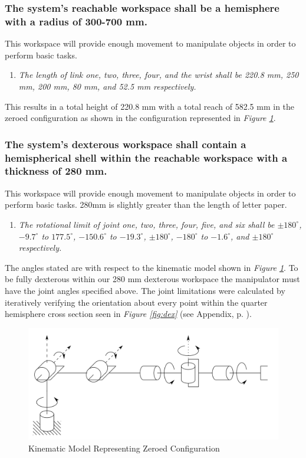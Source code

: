 \documentclass[12pt]{report}
\begin{document}
\subsubsection{The system’s reachable workspace shall be a hemisphere with a radius of 300-700 mm.}
This workspace will provide enough movement to manipulate objects in order to perform basic tasks.
\begin{enumerate}
  \item \textit{The length of link one, two, three, four, and the wrist shall be 220.8 mm, 250 mm, 200 mm, 80 mm, and 52.5 mm respectively.}
\end{enumerate}
  This results in a total height of 220.8 mm with a total reach of 582.5 mm in the zeroed configuration as shown in the configuration represented in \emph{Figure \ref{fig:zero}}.

\subsubsection{The system’s dexterous workspace shall contain a hemispherical shell within the reachable workspace with a thickness of 280 mm.}\label{sec:zero}
This workspace will provide enough movement to manipulate objects in order to perform basic tasks. 280mm is slightly greater than the length of letter paper.
\begin{enumerate}
  \item \textit{The rotational limit of joint one, two, three, four, five, and six shall be \(\pm180^{\circ}\), \(-9.7^{\circ}\) to \(177.5^{\circ}\), \(-150.6^{\circ}\) to \(-19.3^{\circ}\), \(\pm180^{\circ}\), \(-180^{\circ}\) to \(-1.6^{\circ}\), and \(\pm180^{\circ}\) respectively.}
\end{enumerate}
The angles stated are with respect to the kinematic model shown in \emph{Figure \ref{fig:zero}}. To be fully dexterous within our 280 mm dexterous workspace the manipulator must have the joint angles specified above. The joint limitations were calculated by iteratively verifying the orientation about every point within the quarter hemisphere cross section seen in \emph{Figure \ref{fig:dex}} (see Appendix, p. \pageref{sec:app}).
  \begin{figure}[htp]
    \centering
    \includegraphics[width=.75\textwidth]{zero}
    \caption[Kinematic Model Representing Zeroed Configuration]{Kinematic Model Representing Zeroed Configuration \cite{robo}}
    \label{fig:zero}
  \end{figure}
\end{document}

